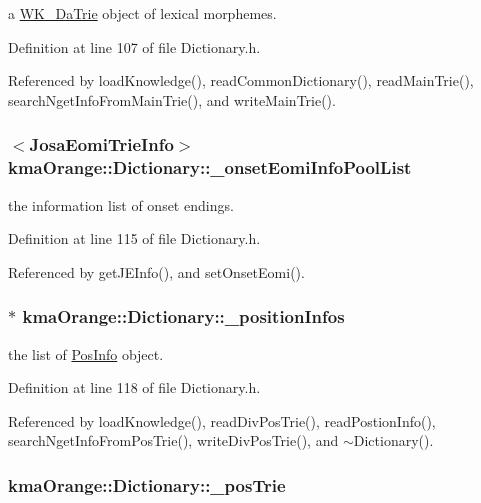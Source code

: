 a \hyperlink{classkmaOrange_1_1WK__DaTrie}{WK\_\-DaTrie} object of lexical morphemes. 



Definition at line 107 of file Dictionary.h.

Referenced by loadKnowledge(), readCommonDictionary(), readMainTrie(), searchNgetInfoFromMainTrie(), and writeMainTrie().\hypertarget{classkmaOrange_1_1Dictionary_0fe6a0d5defdbc12929e04f699e453e3}{
\subsubsection[{\_\-onsetEomiInfoPoolList}]{$<${\bf JosaEomiTrieInfo}$>$ {\bf kmaOrange::Dictionary::\_\-onsetEomiInfoPoolList}}}
\label{classkmaOrange_1_1Dictionary_0fe6a0d5defdbc12929e04f699e453e3}


the information list of onset endings. 



Definition at line 115 of file Dictionary.h.

Referenced by getJEInfo(), and setOnsetEomi().\hypertarget{classkmaOrange_1_1Dictionary_b0750343ed81ceb58888a3576f98d174}{
\subsubsection[{\_\-positionInfos}]{$\ast$ {\bf kmaOrange::Dictionary::\_\-positionInfos}}}
\label{classkmaOrange_1_1Dictionary_b0750343ed81ceb58888a3576f98d174}


the list of \hyperlink{classPosInfo}{PosInfo} object. 



Definition at line 118 of file Dictionary.h.

Referenced by loadKnowledge(), readDivPosTrie(), readPostionInfo(), searchNgetInfoFromPosTrie(), writeDivPosTrie(), and $\sim$Dictionary().\hypertarget{classkmaOrange_1_1Dictionary_c644dfcaa9eada0ee9a9356f8fb3db5a}{
\subsubsection[{\_\-posTrie}]{ {\bf kmaOrange::Dictionary::\_\-posTrie}}}
\label{classkmaOrange_1_1Dictionary_c644dfcaa9eada0ee9a9356f8fb3db5a}


